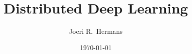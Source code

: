 \documentclass[10pt, a4paper, oneside]{book}
\title{Distributed Deep Learning}                                     %
\author{Joeri R.~Hermans}                                             %
\date{\today}                                                         %
\begin{document}
\frontmatter
\let\cleardoublepage\clearpage

%



\makenomenclature
\tableofcontents

\mainmatter


\end{document}
